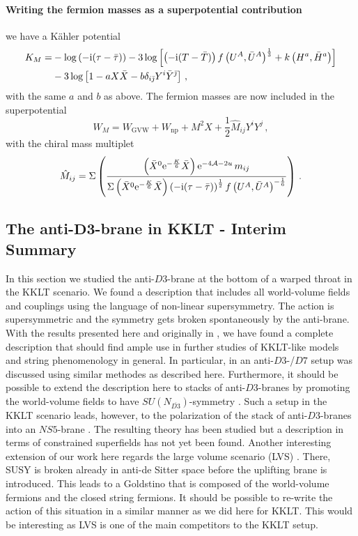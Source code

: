 \documentclass[a4paper,12pt]{report}
\newcommand{\be}{\begin{equation}}
\newcommand{\ee}{\end{equation}}
\newcommand{\bea}{\begin{equation}\begin{aligned}}
\newcommand{\eea}{\end{aligned}\end{equation}}
\def\rmi{{\rm i}}
\def\rme{{\rm e}}
\def\jb{{\bar \jmath}}
\begin{document}
\paragraph{Writing the fermion masses as a superpotential  contribution} we have a Kähler potential
\bea 
K_M = & - \log \left(-\rmi (\tau-\bar{\tau})\right) - 3 \log \left[ \left(-\rmi (T-\bar{T})\right) f\left(U^A,\bar{U}^A \right)^{\frac{1}{3}}+k\left(H^a,\bar{H}^a\right)\right]\\
 & - 3 \log \left[1-a X \bar{X} - b \delta_{i\jb}Y^i \bar{Y}^\jb \right]\,,
 \label{eq:D3barKMfinal}
 \eea
 with the same $a$ and $b$ as above. The fermion masses are now included in the superpotential 
 \be
 W_M = W_{\text{GVW}} + W_{\text{np}} + M^2 X + \frac{1}{2} \hat{M}_{ij} Y^i Y^j\,,
 \label{eq:D3barWMfinal}
 \ee
with the chiral mass multiplet
\be 
\hat{M}_{ij} = \Sigma \left(\frac{\left(\bar{X}^0 \rme^{-\frac{K}{6}}\bar{X}\right)\rme^{-4\mathcal{A}-2u}\,m_{ij}}{\Sigma\left(\bar{X}^0 \rme^{-\frac{K}{6}}\bar{X}\right)\left(-\rmi (\tau-\bar{\tau})\right)^{\frac{1}{2}}f\left(U^A,\bar{U}^A\right)^{-\frac{1}{6}}}\right)\,.
\label{eq:D3barmassmultfinal}
\ee

\subsection[The anti-$D3$-brane in KKLT - Interim Summary]{The anti-$\mathbf{D3}$-brane in KKLT - Interim Summary}
In this section we studied the anti-$D3$-brane at the bottom of a warped throat in the KKLT scenario. We found a description that includes all world-volume fields and couplings using the language of non-linear supersymmetry. The action is supersymmetric and the symmetry gets broken spontaneously by the anti-brane. With the results presented here and originally in \cite{Cribiori:2019hod}, we have found a complete description that should find ample use in further studies of KKLT-like models and string phenomenology in general. In particular, in \cite{Parameswaran:2020ukp} an anti-$D3$-/$D7$ setup was discussed using similar methodes as described here. Furthermore, it should be possible to extend the description here to stacks of anti-$D3$-branes by promoting the world-volume fields to have $SU(N_{\overline{D3}})$-symmetry \cite{McGuirk:2012sb}. Such a setup in the KKLT scenario leads, however, to the polarization of the stack of anti-$D3$-branes into an $NS5$-brane \cite{Kachru:2002gs}. The resulting theory \cite{Aalsma:2017ulu,Aalsma:2018pll} has been studied but a description in terms of constrained superfields has not yet been found. Another interesting extension of our work here regards the large volume scenario (LVS) \cite{Balasubramanian:2005zx,Conlon:2005ki}. There, SUSY is broken already in anti-de Sitter space before the uplifting brane is introduced. This leads to a Goldstino that is composed of the world-volume fermions and the closed string fermions. It should be possible to re-write the action of this situation in a similar manner as we did here for KKLT. This would be interesting as LVS is one of the main competitors to the KKLT setup.
\end{document}
